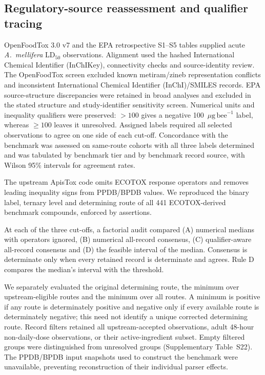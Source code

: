 \documentclass{ieeeaccess}
\newcommand{\ugbee}{\ensuremath{\mu\mathrm{g\,bee}^{-1}}\xspace}
\begin{document}
\subsection{Regulatory-source reassessment and qualifier tracing}
\label{sec:provenance-methods}
OpenFoodTox 3.0 v7 and the EPA retrospective S1--S5 tables\cite{OFT2026,Farruggia2022} supplied acute \textit{A.~mellifera} LD\(_{50}\) observations. Alignment used the hashed International Chemical Identifier (InChIKey), connectivity checks and source-identity review. The OpenFoodTox screen excluded known metiram/zineb representation conflicts and inconsistent International Chemical Identifier (InChI)/SMILES records. EPA source-structure discrepancies were retained in broad analyses and excluded in the stated structure and study-identifier sensitivity screen. Numerical units and inequality qualifiers were preserved: \(>100\) gives a negative 100~\ugbee label, whereas \(\geq100\) leaves it unresolved. Assigned labels required all selected observations to agree on one side of each cut-off. Concordance with the benchmark was assessed on same-route cohorts with all three labels determined and was tabulated by benchmark tier and by benchmark record source, with Wilson 95\% intervals for agreement rates.

The upstream ApisTox code\cite{ApisToxCode} omits ECOTOX response operators and removes leading inequality signs from PPDB/BPDB values. We reproduced the binary label, ternary level and determining route of all 441 ECOTOX-derived benchmark compounds, enforced by assertions.

At each of the three cut-offs, a factorial audit compared (A) numerical medians with operators ignored, (B) numerical all-record consensus, (C) qualifier-aware all-record consensus and (D) the feasible interval of the median. Consensus is determinate only when every retained record is determinate and agrees. Rule D compares the median's interval with the threshold.

We separately evaluated the original determining route, the minimum over upstream-eligible routes and the minimum over all routes. A minimum is positive if any route is determinately positive and negative only if every available route is determinately negative; this need not identify a unique corrected determining route. Record filters retained all upstream-accepted observations, adult 48-hour non-daily-dose observations, or their active-ingredient subset. Empty filtered groups were distinguished from unresolved groups (Supplementary Table~S22). The PPDB/BPDB input snapshots used to construct the benchmark were unavailable, preventing reconstruction of their individual parser effects.
\end{document}
